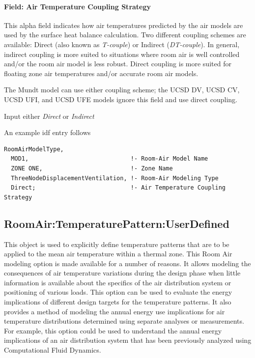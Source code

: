 \paragraph{Field: Air Temperature Coupling Strategy}\label{field-air-temperature-coupling-strategy}

This alpha field indicates how air temperatures predicted by the air models are used by the surface heat balance calculation. Two different coupling schemes are available: Direct (also known as \emph{T-couple}) or Indirect (\emph{DT-couple}). In general, indirect coupling is more suited to situations where room air is well controlled and/or the room air model is less robust. Direct coupling is more suited for floating zone air temperatures and/or accurate room air models.

The Mundt model can use either coupling scheme; the UCSD DV, UCSD CV, UCSD UFI, and UCSD UFE models ignore this field and use direct coupling.

Input either \emph{Direct} or \emph{Indirect}

An example idf entry follows

\begin{lstlisting}
RoomAirModelType,
  MOD1,                             !- Room-Air Model Name
  ZONE ONE,                         !- Zone Name
  ThreeNodeDisplacementVentilation, !- Room-Air Modeling Type
  Direct;                           !- Air Temperature Coupling Strategy
\end{lstlisting}

\subsection{RoomAir:TemperaturePattern:UserDefined}\label{roomairtemperaturepatternuserdefined}

This object is used to explicitly define temperature patterns that are to be applied to the mean air temperature within a thermal zone. This Room Air modeling option is made available for a number of reasons. It allows modeling the consequences of air temperature variations during the design phase when little information is available about the specifics of the air distribution system or positioning of various loads. This option can be used to evaluate the energy implications of different design targets for the temperature patterns. It also provides a method of modeling the annual energy use implications for air temperature distributions determined using separate analyses or measurements. For example, this option could be used to understand the annual energy implications of an air distribution system that has been previously analyzed using Computational Fluid Dynamics.

